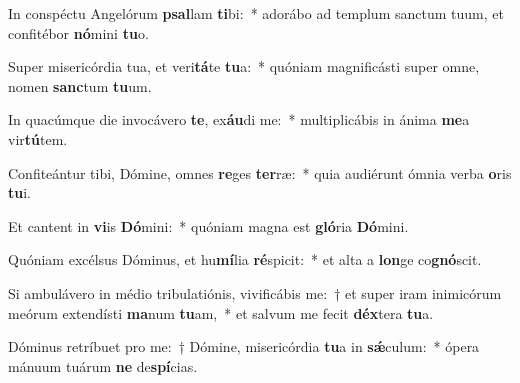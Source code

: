 \item In conspéctu Angelórum \textbf{psal}lam \textbf{ti}bi:~* adorábo ad templum sanctum tuum, et confitébor \textbf{nó}mini \textbf{tu}o.
\item Super misericórdia tua, et veri\textbf{tá}te \textbf{tu}a:~* quóniam magnificásti super omne, nomen \textbf{sanc}tum \textbf{tu}um.
\item In quacúmque die invocávero \textbf{te}, ex\textbf{áu}di me:~* multiplicábis in ánima \textbf{me}a vir\textbf{tú}tem.
\item Confiteántur tibi, Dómine, omnes \textbf{re}ges \textbf{ter}ræ:~* quia audiérunt ómnia verba \textbf{o}ris \textbf{tu}i.
\item Et cantent in \textbf{vi}is \textbf{Dó}mini:~* quóniam magna est \textbf{gló}ria \textbf{Dó}mini.
\item Quóniam excélsus Dóminus, et hu\textbf{mí}lia \textbf{ré}spicit:~* et alta a \textbf{lon}ge co\textbf{gnó}scit.
\item Si ambulávero in médio tribulatiónis, vivificábis me:~† et super iram inimicórum meórum extendísti \textbf{ma}num \textbf{tu}am,~* et salvum me fecit \textbf{déx}tera \textbf{tu}a.
\item Dóminus retríbuet pro me:~† Dómine, misericórdia \textbf{tu}a in \textbf{sǽ}culum:~* ópera mánuum tuárum \textbf{ne} de\textbf{spí}cias.

